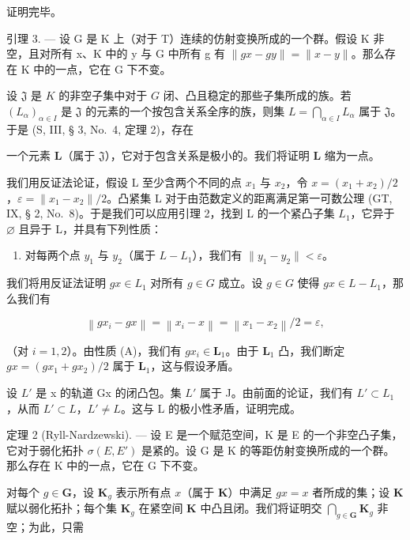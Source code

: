 证明完毕。

引理 3. --- 设 G 是 K 上（对于 T）连续的仿射变换所成的一个群。假设 K 非空，且对所有 x、K 中的 y 与 G 中所有 g 有 \(\|gx - gy\| = \|x - y\|\)。那么存在 K 中的一点，它在 G 下不变。

设 \(\mathfrak{J}\) 是 \(K\) 的非空子集中对于 \(G\) 闭、凸且稳定的那些子集所成的族。若 \((L_{\alpha})_{\alpha \in I}\) 是 \(\mathfrak{J}\) 的元素的一个按包含关系全序的族，则集 \(L = \bigcap_{\alpha \in I} L_{\alpha}\) 属于 \(\mathfrak{J}\)。于是 (S, III, § 3, No.~4, 定理 2)，存在

一个元素 \(\mathbf{L}\)（属于 \(\mathfrak{J}\)），它对于包含关系是极小的。我们将证明 \(\mathbf{L}\) 缩为一点。

我们用反证法论证，假设 L 至少含两个不同的点 \(x_{1}\) 与 \(x_{2}\)，令 \(x = (x_{1} + x_{2})/2\)，\(\varepsilon = \|x_{1} - x_{2}\|/2\)。凸紧集 L 对于由范数定义的距离满足第一可数公理 (GT, IX, § 2, No.~8)。于是我们可以应用引理 2，找到 L 的一个紧凸子集 \(L_{1}\)，它异于 \(\varnothing\) 且异于 L，并具有下列性质：

\begin{enumerate}
\def\labelenumi{(\Alph{enumi})}
\tightlist
\item
  对每两个点 \(y_{1}\) 与 \(y_{2}\)（属于 \(L - L_{1}\)），我们有 \(\|y_{1} - y_{2}\| < \varepsilon\)。
\end{enumerate}

我们将用反证法证明 \(gx \in L_{1}\) 对所有 \(g \in G\) 成立。设 \(g \in G\) 使得 \(gx \in L - L_{1}\)，那么我们有

\[
\left\| g x _ {i} - g x \right\| = \left\| x _ {i} - x \right\| = \left\| x _ {1} - x _ {2} \right\| / 2 = \varepsilon ,
\]

（对 \(i = 1, 2\)）。由性质 (A)，我们有 \(gx_{i} \in \mathbf{L}_{1}\)。由于 \(\mathbf{L}_{1}\) 凸，我们断定 \(gx = (gx_{1} + gx_{2}) / 2\) 属于 \(\mathbf{L}_{1}\)，这与假设矛盾。

设 \(L'\) 是 x 的轨道 Gx 的闭凸包。集 \(L'\) 属于 J。由前面的论证，我们有 \(L' \subset L_1\)，从而 \(L' \subset L\)，\(L' \neq L\)。这与 L 的极小性矛盾，证明完成。

定理 2 (Ryll-Nardzewski). --- 设 E 是一个赋范空间，K 是 E 的一个非空凸子集，它对于弱化拓扑 \(\sigma(E, E')\) 是紧的。设 G 是 K 的等距仿射变换所成的一个群。那么存在 K 中的一点，它在 G 下不变。

对每个 \(g \in \mathbf{G}\)，设 \(\mathbf{K}_g\) 表示所有点 \(x\)（属于 \(\mathbf{K}\)）中满足 \(gx = x\) 者所成的集；设 \(\mathbf{K}\) 赋以弱化拓扑；每个集 \(\mathbf{K}_g\) 在紧空间 \(\mathbf{K}\) 中凸且闭。我们将证明交 \(\bigcap_{g \in \mathbf{G}} \mathbf{K}_g\) 非空；为此，只需

